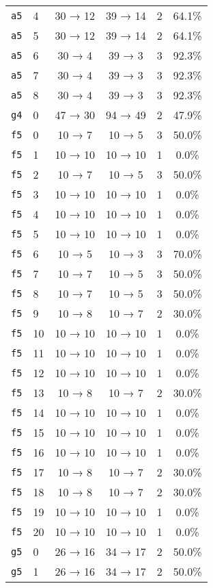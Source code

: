 \begin{tabular}{llcccc}
\texttt{a5} & 4 & 30 → 12 & 39 → 14 & 2 & 64.1\% \\
\texttt{a5} & 5 & 30 → 12 & 39 → 14 & 2 & 64.1\% \\
\texttt{a5} & 6 & 30 → 4 & 39 → 3 & 3 & 92.3\% \\
\texttt{a5} & 7 & 30 → 4 & 39 → 3 & 3 & 92.3\% \\
\texttt{a5} & 8 & 30 → 4 & 39 → 3 & 3 & 92.3\% \\
\texttt{g4} & 0 & 47 → 30 & 94 → 49 & 2 & 47.9\% \\
\texttt{f5} & 0 & 10 → 7 & 10 → 5 & 3 & 50.0\% \\
\texttt{f5} & 1 & 10 → 10 & 10 → 10 & 1 & 0.0\% \\
\texttt{f5} & 2 & 10 → 7 & 10 → 5 & 3 & 50.0\% \\
\texttt{f5} & 3 & 10 → 10 & 10 → 10 & 1 & 0.0\% \\
\texttt{f5} & 4 & 10 → 10 & 10 → 10 & 1 & 0.0\% \\
\texttt{f5} & 5 & 10 → 10 & 10 → 10 & 1 & 0.0\% \\
\texttt{f5} & 6 & 10 → 5 & 10 → 3 & 3 & 70.0\% \\
\texttt{f5} & 7 & 10 → 7 & 10 → 5 & 3 & 50.0\% \\
\texttt{f5} & 8 & 10 → 7 & 10 → 5 & 3 & 50.0\% \\
\texttt{f5} & 9 & 10 → 8 & 10 → 7 & 2 & 30.0\% \\
\texttt{f5} & 10 & 10 → 10 & 10 → 10 & 1 & 0.0\% \\
\texttt{f5} & 11 & 10 → 10 & 10 → 10 & 1 & 0.0\% \\
\texttt{f5} & 12 & 10 → 10 & 10 → 10 & 1 & 0.0\% \\
\texttt{f5} & 13 & 10 → 8 & 10 → 7 & 2 & 30.0\% \\
\texttt{f5} & 14 & 10 → 10 & 10 → 10 & 1 & 0.0\% \\
\texttt{f5} & 15 & 10 → 10 & 10 → 10 & 1 & 0.0\% \\
\texttt{f5} & 16 & 10 → 10 & 10 → 10 & 1 & 0.0\% \\
\texttt{f5} & 17 & 10 → 8 & 10 → 7 & 2 & 30.0\% \\
\texttt{f5} & 18 & 10 → 8 & 10 → 7 & 2 & 30.0\% \\
\texttt{f5} & 19 & 10 → 10 & 10 → 10 & 1 & 0.0\% \\
\texttt{f5} & 20 & 10 → 10 & 10 → 10 & 1 & 0.0\% \\
\texttt{g5} & 0 & 26 → 16 & 34 → 17 & 2 & 50.0\% \\
\texttt{g5} & 1 & 26 → 16 & 34 → 17 & 2 & 50.0\% \\

\end{tabular}
